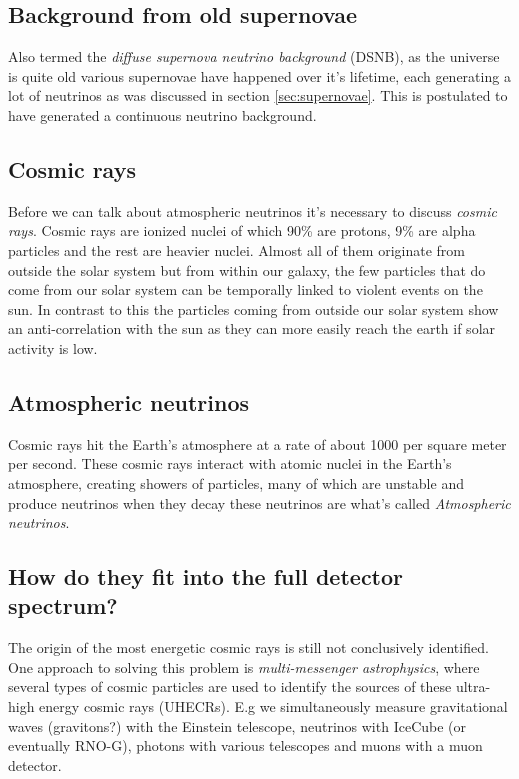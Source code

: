 \documentclass[11pt,a4paper,faculty=we,language=en,doctype=report]{cls/ugent-doc}
\begin{document}
\subsection{Background from old supernovae}
Also termed the \textit{diffuse supernova neutrino background} (DSNB), as the
universe is quite old various supernovae have happened over it's lifetime, each generating
a lot of neutrinos as was discussed in section \ref{sec:supernovae}. 
This is postulated to have generated a continuous neutrino background.
\subsection{Cosmic rays}
Before we can talk about atmospheric neutrinos it's necessary to discuss \textit{cosmic rays}.
Cosmic rays are ionized nuclei of which 90\% are protons, 9\% are alpha particles and
the rest are heavier nuclei. Almost all of them originate from outside the solar system but
from within our galaxy, the few particles that do come from our solar system can be temporally
linked to violent events on the sun. In contrast to this the particles coming from outside
our solar system show an anti-correlation with the sun as they can more easily reach the earth
if solar activity is low.
\subsection{Atmospheric neutrinos}
Cosmic rays hit the Earth's atmosphere at a rate of about 1000 per square meter per second.
These cosmic rays interact with atomic
nuclei in the Earth's atmosphere, creating showers of particles, many of which
are unstable and produce neutrinos when they decay these neutrinos are what's called 
\textit{Atmospheric neutrinos}.
\subsection{How do they fit into the full detector spectrum?}
The origin of the most energetic cosmic rays is still not conclusively
identified. One approach to solving this problem is \textit{multi-messenger
astrophysics}, where several types of cosmic particles are used to identify the
sources of these ultra-high energy cosmic rays (UHECRs). E.g we simultaneously
measure gravitational waves (gravitons?) with the Einstein telescope,
neutrinos with IceCube (or eventually RNO-G), photons with various telescopes
and muons with a muon detector.
\end{document}
